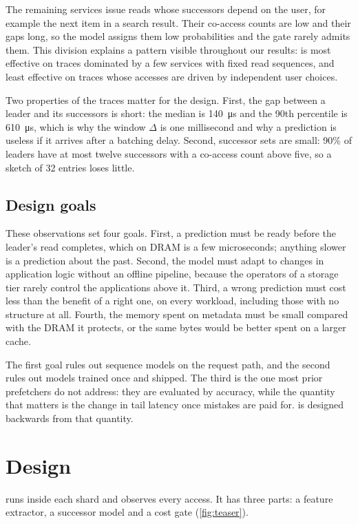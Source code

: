 \documentclass[10pt, twocolumn]{article}
\begin{document}
The remaining services issue reads whose successors depend on the user, for
example the next item in a search result. Their co-access counts are low and
their gaps long, so the model assigns them low probabilities and the gate
rarely admits them. This division explains a pattern visible throughout our
results: \sys{} is most effective on traces dominated by a few services
with fixed read sequences, and least effective on traces whose accesses are
driven by independent user choices.

Two properties of the traces matter for the design. First, the gap between
a leader and its successors is short: the median is \SI{140}{\micro\second}
and the 90th percentile is \SI{610}{\micro\second}, which is why the window
$\Delta$ is one millisecond and why a prediction is useless if it arrives
after a batching delay. Second, successor sets are small: 90\% of leaders
have at most twelve successors with a co-access count above five, so a
sketch of 32 entries loses little.

\subsection{Design goals}
These observations set four goals. First, a prediction must be ready before
the leader's read completes, which on DRAM is a few microseconds; anything
slower is a prediction about the past. Second, the model must adapt to
changes in application logic without an offline pipeline, because the
operators of a storage tier rarely control the applications above it.
Third, a wrong prediction must cost less than the benefit of a right one,
on every workload, including those with no structure at all. Fourth, the
memory spent on metadata must be small compared with the DRAM it protects,
or the same bytes would be better spent on a larger cache.

The first goal rules out sequence models on the request path, and the
second rules out models trained once and shipped. The third is the one most
prior prefetchers do not address: they are evaluated by accuracy, while the
quantity that matters is the change in tail latency once mistakes are paid
for. \sys{} is designed backwards from that quantity.

\section{Design}
\label{sec:model}

\sys{} runs inside each shard and observes every access. It has
three parts: a feature extractor, a successor model and a cost gate
(\cref{fig:teaser}).
\end{document}
